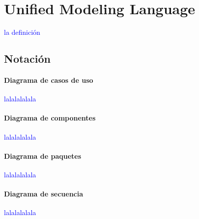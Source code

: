 \chapter{Unified Modeling Language}
\textcolor{blue}{la definición}
\section{Notación}
\subsubsection{Diagrama de casos de uso}
\textcolor{blue}{lalalalalala}
\subsubsection{Diagrama de componentes}
\textcolor{blue}{lalalalalala}
\subsubsection{Diagrama de paquetes}
\textcolor{blue}{lalalalalala}
\subsubsection{Diagrama de secuencia}
\textcolor{blue}{lalalalalala}
